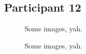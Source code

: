 \lipsum[1]


\clearpage

\subsection{Participant 12}

\begin{figure}[h]
	\caption{Some images, yah.}
\end{figure}

\lipsum[1]

\clearpage

\begin{figure}[h]
	\caption{Some images, yah.}
\end{figure}

